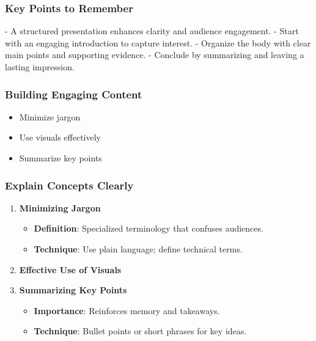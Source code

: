 \documentclass[aspectratio=169]{beamer}
\begin{document}
\begin{frame}[fragile]
    \frametitle{Key Points to Remember}
    - A structured presentation enhances clarity and audience engagement.
    - Start with an engaging introduction to capture interest.
    - Organize the body with clear main points and supporting evidence.
    - Conclude by summarizing and leaving a lasting impression.
\end{frame}

\begin{frame}[fragile]
    \frametitle{Building Engaging Content}
    \begin{itemize}
        \item Minimize jargon
        \item Use visuals effectively
        \item Summarize key points
    \end{itemize}
\end{frame}

\begin{frame}[fragile]
    \frametitle{Explain Concepts Clearly}
    \begin{enumerate}
        \item \textbf{Minimizing Jargon}
            \begin{itemize}
                \item \textbf{Definition}: Specialized terminology that confuses audiences.
                \item \textbf{Technique}: Use plain language; define technical terms.
            \end{itemize}
        \item \textbf{Effective Use of Visuals}
        \item \textbf{Summarizing Key Points}
            \begin{itemize}
                \item \textbf{Importance}: Reinforces memory and takeaways.
                \item \textbf{Technique}: Bullet points or short phrases for key ideas.
            \end{itemize}
    \end{enumerate}
\end{frame}
\end{document}
